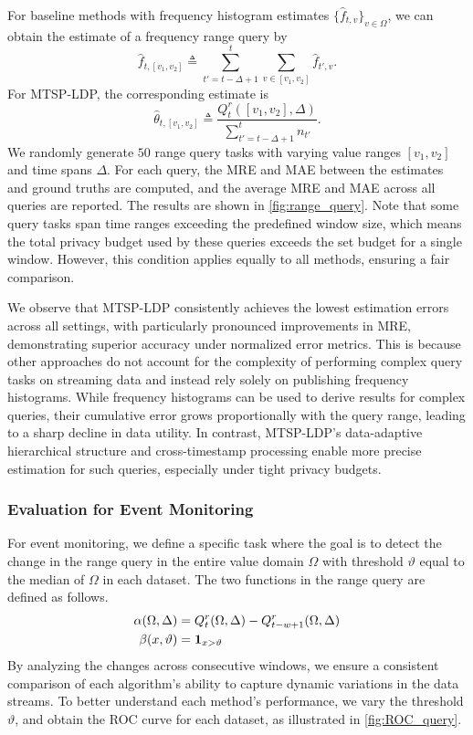 

For baseline methods with frequency histogram estimates
$\{\hat{f}_{t,v}\}_{v\in\Omega}$, we can obtain the estimate of a frequency range query by
\[
  \hat{f}_{t,[v_1,v_2]}
  \triangleq \sum_{t'=t-\Delta+1}^t\sum_{v\in[v_1,v_2]} \hat{f}_{t',v}.
\]
For MTSP-LDP, the corresponding estimate is
\[
  \hat\theta_{t,[v_1,v_2]}
  \triangleq \frac{Q_t^r([v_1,v_2],\Delta)}{\sum_{t'=t-\Delta+1}^t n_{t'}}.
\]
We randomly generate $50$ range query tasks with varying value ranges
$[v_1,v_2]$ and time spans $\Delta$.
For each query, the MRE and MAE between the estimates and ground truths are
computed, and the average MRE and MAE across all queries are reported.
The results are shown in \cref{fig:range_query}.
Note that some query tasks span time ranges exceeding the predefined window
size, which means the total privacy budget used by these queries exceeds the set
budget for a single window.
However, this condition applies equally to all methods, ensuring a fair
comparison.

We observe that MTSP-LDP consistently achieves the lowest estimation errors
across all settings, with particularly pronounced improvements in MRE,
demonstrating superior accuracy under normalized error metrics.
This is because other approaches do not account for the complexity of performing
complex query tasks on streaming data and instead rely solely on publishing
frequency histograms.
While frequency histograms can be used to derive results for complex queries,
their cumulative error grows proportionally with the query range, leading to a
sharp decline in data utility.
In contrast, MTSP-LDP's data-adaptive hierarchical structure and cross-timestamp
processing enable more precise estimation for such queries, especially under
tight privacy budgets.


\subsubsection{Evaluation for Event Monitoring}

For event monitoring, we define a specific task where the goal is to detect the
change in the range query in the entire value domain $\Omega$ with threshold
$\vartheta$ equal to the median of $\Omega$ in each dataset.
The two functions in the range query are defined as follows.
\begin{align*}
  \alpha(\Omega,\Delta) &= Q_t^r(\Omega,\Delta)-Q_{t-w+1}^r(\Omega,\Delta)\\
  \beta(x,\vartheta) &= \mathbf{1}_{x>\vartheta}
\end{align*}
By analyzing the changes across consecutive windows, we ensure a consistent
comparison of each algorithm's ability to capture dynamic variations in the data
streams.
To better understand each method's performance, we vary the threshold
$\vartheta$, and obtain the ROC curve for each dataset, as illustrated in
\cref{fig:ROC_query}.

